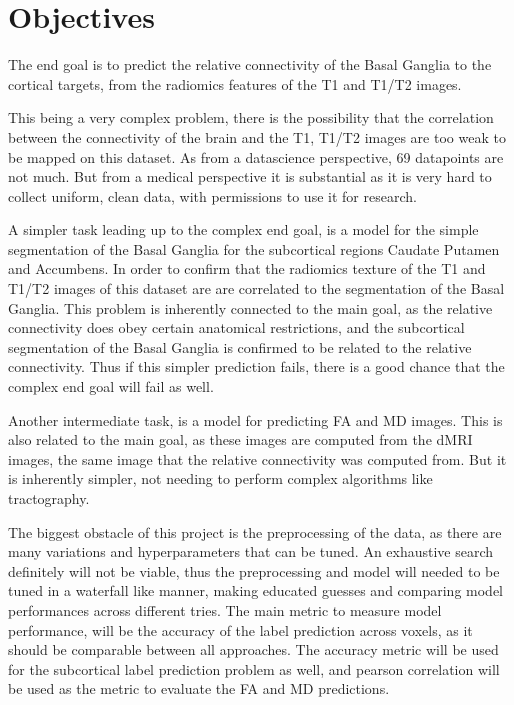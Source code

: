 \section{Objectives}

The end goal is to predict the relative connectivity of the Basal Ganglia to the cortical targets, from the radiomics features of the T1 and T1/T2 images.\par

This being a very complex problem, there is the possibility that the correlation between the connectivity of the brain and the T1, T1/T2 images are too weak to be mapped on this dataset. As from a datascience perspective, 69 datapoints are not much. But from a medical perspective it is substantial as it is very hard to collect uniform, clean data, with permissions to use it for research.\par

A simpler task leading up to the complex end goal, is a model for the simple segmentation of the Basal Ganglia for the subcortical regions Caudate Putamen and Accumbens. In order to confirm that the radiomics texture of the T1 and T1/T2 images of this dataset are are correlated to the segmentation of the Basal Ganglia. This problem is inherently connected to the main goal, as the relative connectivity does obey certain anatomical restrictions, and the subcortical segmentation of the Basal Ganglia is confirmed to be related to the relative connectivity. Thus if this simpler prediction fails, there is a good chance that the complex end goal will fail as well.\par

Another intermediate task, is a model for predicting \ac{FA} and \ac{MD} images. This is also related to the main goal, as these images are computed from the \ac{dMRI} images, the same image that the relative connectivity was computed from. But it is inherently simpler, not needing to perform complex algorithms like tractography.\par

The biggest obstacle of this project is the preprocessing of the data, as there are many variations and hyperparameters that can be tuned. An exhaustive search definitely will not be viable, thus the preprocessing and model will needed to be tuned in a waterfall like manner, making educated guesses and comparing model performances across different tries. The main metric to measure model performance, will be the accuracy of the label prediction across voxels, as it should be comparable between all approaches. The accuracy metric will be used for the subcortical label prediction problem as well, and pearson correlation will be used as the metric to evaluate the \ac{FA} and \ac{MD} predictions.

